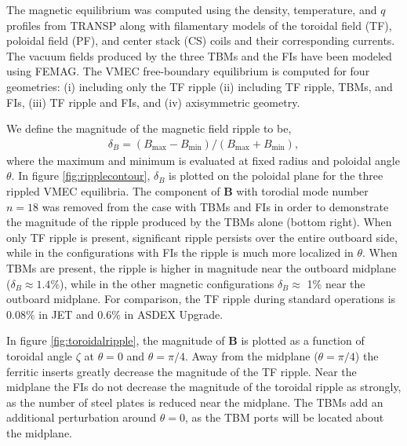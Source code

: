 \documentclass[aip, pop, preprint]{revtex4-1}
\numberwithin{figure}{section}
\numberwithin{equation}{section}
\begin{document}
The magnetic equilibrium was computed using the density, temperature, and $q$ profiles from TRANSP along with filamentary models of the toroidal field (TF), poloidal field (PF), and center stack (CS) coils and their corresponding currents. The vacuum fields produced by the three TBMs and the FIs have been modeled using FEMAG.\cite{Shinohara2009} The VMEC free-boundary equilibrium \cite{Hirshman1986} is computed for four geometries: (i) including only the TF ripple (ii) including TF ripple, TBMs, and FIs, (iii) TF ripple and FIs, and (iv) axisymmetric geometry.  

We define the magnitude of the magnetic field ripple to be,
\begin{gather}
\delta_B = (B_{\text{max}}-B_{\text{min}})/(B_{\text{max}} + B_{\text{min}}), 
\end{gather}
where the maximum and minimum is evaluated at fixed radius and poloidal angle $\theta$. In figure \ref{fig:ripplecontour}, $\delta_B$ is plotted on the poloidal plane for the three rippled VMEC equilibria. The component of $\bm{B}$ with torodial mode number $n = 18$ was removed from the case with TBMs and FIs in order to demonstrate the magnitude of the ripple produced by the TBMs alone (bottom right). When only TF ripple is present, significant ripple persists over the entire outboard side, while in the configurations with FIs the ripple is much more localized in $\theta$. When TBMs are present, the ripple is higher in magnitude near the outboard midplane ($\delta_B \approx 1.4\%$), while in the other magnetic configurations $\delta_B \approx$ 1\% near the outboard midplane. For comparison, the TF ripple during standard operations is $0.08\%$ in JET \cite{DeVries2008} and $0.6\%$ in ASDEX Upgrade.\cite{Martitsch2016} 

In figure \ref{fig:toroidalripple}, the magnitude of $\bm{B}$ is plotted as a function of toroidal angle $\zeta$ at $\theta = 0$ and $\theta = \pi/4$. Away from the midplane ($\theta = \pi/4$) the ferritic inserts greatly decrease the magnitude of the TF ripple. Near the midplane the FIs do not decrease the magnitude of the toroidal ripple as strongly, as the number of steel plates is reduced near the midplane.\cite{Shinohara2009} The TBMs add an additional perturbation around $\theta = 0$, as the TBM ports will be located about the midplane. 

\FloatBarrier
\end{document}
